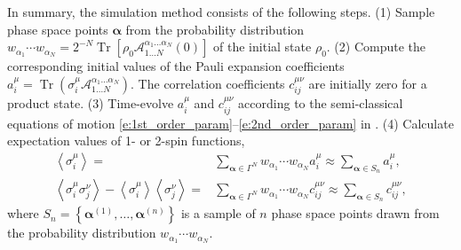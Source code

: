 \documentclass[aps,prl,showpacs,amsmath,amssymb,superscriptaddress,reprint,10pt]{revtex4-1}
\newcommand{\mvec}[1]{\boldsymbol #1}
\DeclareMathOperator{\Tr}{{Tr}}
\begin{document}
\begin{bibunit}
In summary, the simulation method consists of the following steps. (1) Sample phase space points $\mvec{\alpha}$ from the probability distribution $w_{\alpha_1}\cdots w_{\alpha_N}=2^{-N}\Tr\left[\rho_0 \mathscr{A}_{1\dotsc N}^{\alpha_1\dotsc\alpha_N}(0)\right]$ of the initial state $\rho_0$. (2) Compute the corresponding initial values of the Pauli expansion coefficients $a_i^\mu=\Tr\left(\sigma_i^\mu \mathscr{A}_{1\dotsc N}^{\alpha_1\dotsc\alpha_N}\right)$. The correlation coefficients $c_{ij}^{\mu\nu}$ are initially zero for a product state. (3) Time-evolve $a_i^\mu$ and $c_{ij}^{\mu\nu}$ according to the semi-classical equations of motion \eqref{e:1st_order_param}--\eqref{e:2nd_order_param} in \cite{Note1}. (4) Calculate expectation values of 1- or 2-spin functions,
\begin{subequations}
\begin{align}
\left\langle\sigma_i^\mu\right\rangle =& \sum_{\mvec{\alpha}\in\Gamma^N}w_{\alpha_1}\cdots w_{\alpha_N} a_i^\mu \approx \sum_{\mvec{\alpha}\in S_n}a_i^\mu,\label{e:1spin}\\
\left\langle\sigma_i^\mu\sigma_j^\nu\right\rangle - \left\langle\sigma_i^\mu\right\rangle\left\langle\sigma_j^\nu\right\rangle =& \sum_{\mvec{\alpha}\in\Gamma^N}w_{\alpha_1}\cdots w_{\alpha_N} c_{ij}^{\mu\nu} \approx \sum_{\mvec{\alpha}\in S_n}c_{ij}^{\mu\nu},\label{e:2spin}
\end{align}
\end{subequations}
where $S_n=\left\{\mvec{\alpha}^{(1)},\dots,\mvec{\alpha}^{(n)}\right\}$ is a sample of $n$ phase space points drawn from the probability distribution $w_{\alpha_1}\cdots w_{\alpha_N}$.



\end{bibunit}
\end{document}
